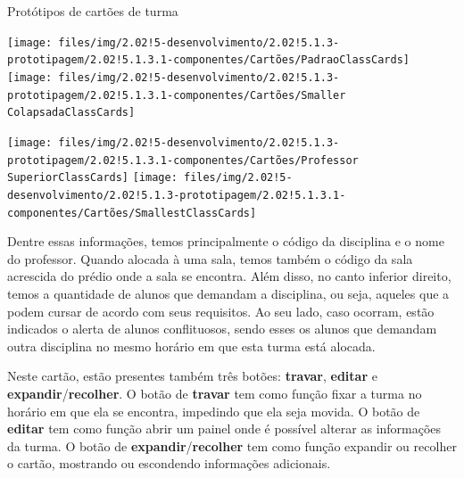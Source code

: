 \begin{MyCenteredFigure} \caption{Protótipos de cartões de turma} \label{fig:cartão_de_turma}
  \begin{minipage}{0.48\textwidth} \centering
    \texttt{[image: files/img/2.02!5-desenvolvimento/2.02!5.1.3-prototipagem/2.02!5.1.3.1-componentes/Cartões/PadraoClassCards]}
    \vspace{1mm} \vfill
    \texttt{[image: files/img/2.02!5-desenvolvimento/2.02!5.1.3-prototipagem/2.02!5.1.3.1-componentes/Cartões/Smaller ColapsadaClassCards]}
  \end{minipage}
  \hfill
  \begin{minipage}{0.48\textwidth} \centering
    \texttt{[image: files/img/2.02!5-desenvolvimento/2.02!5.1.3-prototipagem/2.02!5.1.3.1-componentes/Cartões/Professor SuperiorClassCards]}
    \vspace{1mm} \vfill
    \texttt{[image: files/img/2.02!5-desenvolvimento/2.02!5.1.3-prototipagem/2.02!5.1.3.1-componentes/Cartões/SmallestClassCards]}
  \end{minipage}
\end{MyCenteredFigure}

Dentre essas informações, temos principalmente o código da disciplina e o nome do professor. Quando alocada à uma sala, temos também o código da sala acrescida do prédio onde a sala se encontra. Além disso, no canto inferior direito, temos a quantidade de alunos que demandam a disciplina, ou seja, aqueles que a podem cursar de acordo com seus requisitos. Ao seu lado, caso ocorram, estão indicados o alerta de alunos conflituosos, sendo esses os alunos que demandam outra disciplina no mesmo horário em que esta turma está alocada.

Neste cartão, estão presentes também três botões: \textbf{travar}, \textbf{editar} e \textbf{expandir}/\textbf{recolher}. O botão de \textbf{travar} tem como função fixar a turma no horário em que ela se encontra, impedindo que ela seja movida. O botão de \textbf{editar} tem como função abrir um painel onde é possível alterar as informações da turma. O botão de \textbf{expandir}/\textbf{recolher} tem como função expandir ou recolher o cartão, mostrando ou escondendo informações adicionais.

